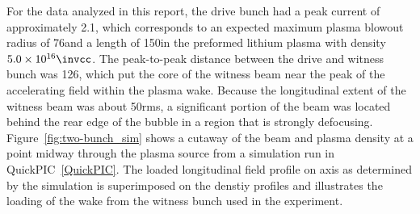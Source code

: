 For the data analyzed in this report, the drive bunch had a peak
current of approximately 2.1\kA, which corresponds to an expected
maximum plasma blowout radius of 76\um and a length of 150\um in the
preformed lithium plasma with density ${5.0 \times
10^{16}\invcc}$. The peak-to-peak distance between the drive and
witness bunch was 126\um, which put the core of the witness beam near
the peak of the accelerating field within the plasma wake. Because the
longitudinal extent of the witness beam was about 50\um rms, a
significant portion of the beam was located behind the rear edge of
the bubble in a region that is strongly
defocusing. Figure~\ref{fig:two-bunch_sim} shows a cutaway of the beam
and plasma density at a point midway through the plasma source from a
simulation run in QuickPIC~\ref{QuickPIC}. The loaded longitudinal
field profile on axis as determined by the simulation is superimposed
on the denstiy profiles and illustrates the loading of the wake from
the witness bunch used in the experiment.
